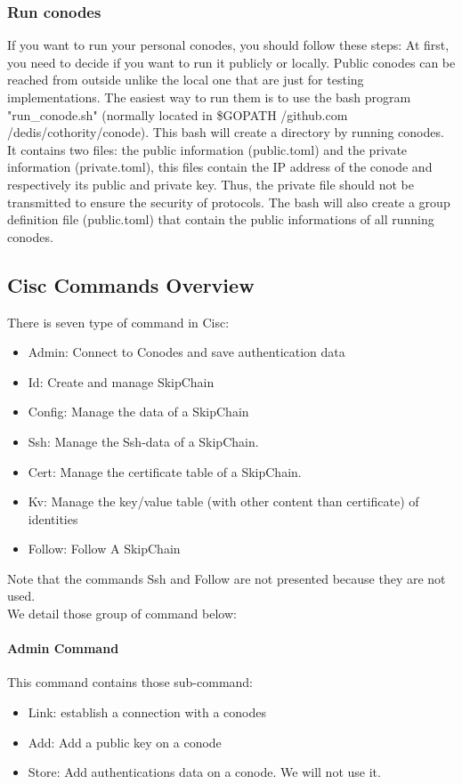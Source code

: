 \documentclass[11pt, a4paper, twoside, openright]{article}
\begin{document}
\subsubsection{Run conodes}
If you want to run your personal conodes, you should follow these steps:
At first, you need to decide if you want to run it publicly or locally. Public conodes can be reached from outside unlike the local one that are just for testing implementations. The easiest way to run them is to use the bash program "run\_conode.sh" (normally located in \$GOPATH /github.com /dedis/cothority/conode).
This bash will create a directory by running conodes. It contains two files: the public information (public.toml) and the private information (private.toml), this files contain the IP address of the conode and respectively its public and private key. Thus, the private file should not be transmitted to ensure the security of protocols. The bash will also create a group definition file (public.toml) that contain the public informations of all running conodes. 
\subsection{Cisc Commands Overview}
There is seven type of command in Cisc: 
\begin{itemize}
\item Admin: Connect to Conodes and save authentication data
\item Id: Create and manage SkipChain
\item Config: Manage the data of a SkipChain
\item Ssh: Manage the Ssh-data of a SkipChain. 
\item Cert: Manage the certificate table of a SkipChain.
\item Kv: Manage the key/value table (with other content than certificate) of identities
\item Follow: Follow A SkipChain

\end{itemize}
Note that the commands Ssh and Follow are not presented because they are not used.
\\We detail those group of command below:
\paragraph{Admin Command} This command contains those sub-command:
\begin{itemize}
\item Link: establish a connection with a conodes
\item Add: Add a public key on a conode
\item Store: Add authentications data on a conode. We will not use it. 
\end{itemize}
\end{document}

